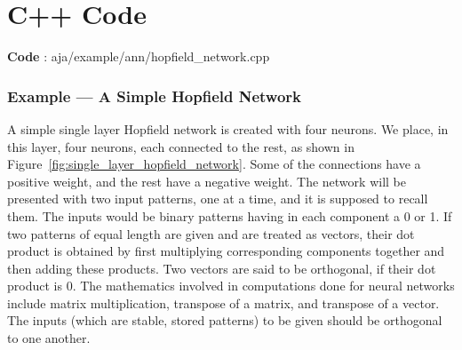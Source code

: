 \chapter{C++ Code}

\textbf{Code} :  aja/example/ann/hopfield\_network.cpp

\subsection {Example — A Simple Hopfield Network}
\label{sec:example_a_simple_hopfield_network}
A simple single layer Hopfield network is created with four neurons. We place, in
this layer, four neurons, each connected to the rest, as shown in Figure~\ref{fig:single_layer_hopfield_network}. Some of the connections have a positive weight, 
and the rest have a negative weight. The network
will be presented with two input patterns, one at a time, and it is supposed to recall them.
The inputs would be binary patterns having in each component a 0 or 1. If two patterns
of equal length are given and are treated as vectors, their dot product is obtained by first
multiplying corresponding components together and then adding these products. Two
vectors are said to be orthogonal, if their dot product is 0. The mathematics involved in
computations done for neural networks include matrix multiplication, transpose of a
matrix, and transpose of a vector. The inputs (which are stable, stored patterns) to be given should be orthogonal to one another.

